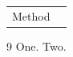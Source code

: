 \documentclass{article}
\begin{document}
\begin{tabular}{lc}
Method \cite{a} & \cite{b,a}
\end{tabular}

\begin{thebibliography}{9}
 One.
 Two.
\end{thebibliography}
\end{document}
